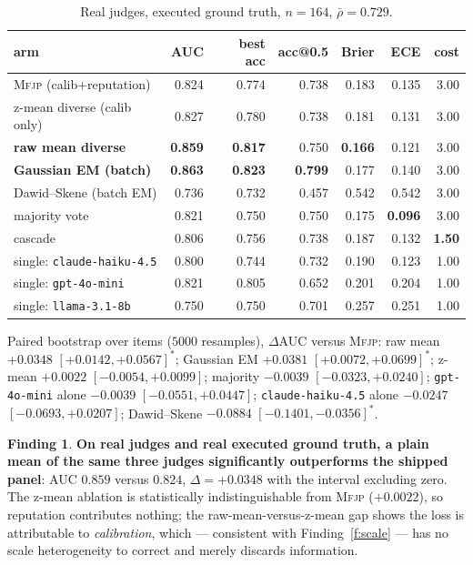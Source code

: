 \documentclass[11pt]{article}
\theoremstyle{definition}
\newtheorem{finding}{Finding}
\newcommand{\rhobar}{\ensuremath{\bar{\rho}}}
\newcommand{\mfjp}{\textsc{Mfjp}}
\begin{document}
\begin{table}[H]\centering
\begin{tabular}{lrrrrrr}
\toprule
arm & AUC & best acc & acc@0.5 & Brier & ECE & cost \\
\midrule
\mfjp{} (calib+reputation)   & 0.824 & 0.774 & 0.738 & 0.183 & 0.135 & 3.00 \\
z-mean diverse (calib only)  & 0.827 & 0.780 & 0.738 & 0.181 & 0.131 & 3.00 \\
\textbf{raw mean diverse}    & \textbf{0.859} & \textbf{0.817} & 0.750 & \textbf{0.166} & 0.121 & 3.00 \\
\textbf{Gaussian EM (batch)} & \textbf{0.863} & \textbf{0.823} & \textbf{0.799} & 0.177 & 0.140 & 3.00 \\
Dawid--Skene (batch EM)      & 0.736 & 0.732 & 0.457 & 0.542 & 0.542 & 3.00 \\
majority vote                & 0.821 & 0.750 & 0.750 & 0.175 & \textbf{0.096} & 3.00 \\
cascade                      & 0.806 & 0.756 & 0.738 & 0.187 & 0.132 & \textbf{1.50} \\
single: \texttt{claude-haiku-4.5} & 0.800 & 0.744 & 0.732 & 0.190 & 0.123 & 1.00 \\
single: \texttt{gpt-4o-mini} & 0.821 & 0.805 & 0.652 & 0.201 & 0.204 & 1.00 \\
single: \texttt{llama-3.1-8b}& 0.750 & 0.750 & 0.701 & 0.257 & 0.251 & 1.00 \\
\bottomrule
\end{tabular}
\caption{Real judges, executed ground truth, $n=164$, $\rhobar=0.729$.}
\end{table}

Paired bootstrap over items ($5000$ resamples), $\Delta$AUC versus \mfjp{}:
raw mean $+0.0348$ $[+0.0142,+0.0567]^{*}$;
Gaussian EM $+0.0381$ $[+0.0072,+0.0699]^{*}$;
z-mean $+0.0022$ $[-0.0054,+0.0099]$;
majority $-0.0039$ $[-0.0323,+0.0240]$;
\texttt{gpt-4o-mini} alone $-0.0039$ $[-0.0551,+0.0447]$;
\texttt{claude-haiku-4.5} alone $-0.0247$ $[-0.0693,+0.0207]$;
Dawid--Skene $-0.0884$ $[-0.1401,-0.0356]^{*}$.

\begin{finding}
\textbf{On real judges and real executed ground truth, a plain mean of the same three judges
significantly outperforms the shipped panel}: AUC $0.859$ versus $0.824$, $\Delta=+0.0348$
with the interval excluding zero. The z-mean ablation is statistically indistinguishable from
\mfjp{} ($+0.0022$), so reputation contributes nothing; the raw-mean-versus-z-mean gap shows
the loss is attributable to \emph{calibration}, which --- consistent with
Finding~\ref{f:scale} --- has no scale heterogeneity to correct and merely discards
information.
\end{finding}
\end{document}
